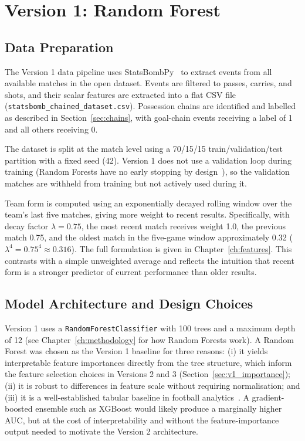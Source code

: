 \chapter{Version 1: Random Forest}\label{ch:v1}

\section{Data Preparation}

The Version 1 data pipeline uses StatsBombPy~\cite{statsbombpy} to extract events from all available matches in the open dataset. Events are filtered to passes, carries, and shots, and their scalar features are extracted into a flat CSV file (\texttt{statsbomb\_chained\_dataset.csv}). Possession chains are identified and labelled as described in Section~\ref{sec:chains}, with goal-chain events receiving a label of 1 and all others receiving 0.

The dataset is split at the match level using a 70/15/15 train/validation/test partition with a fixed seed (42). Version 1 does not use a validation loop during training (Random Forests have no early stopping by design~\cite{breiman2001}), so the validation matches are withheld from training but not actively used during it.

Team form is computed using an exponentially decayed rolling window over the team's last five matches, giving more weight to recent results. Specifically, with decay factor $\lambda = 0.75$, the most recent match receives weight 1.0, the previous match 0.75, and the oldest match in the five-game window approximately 0.32 ($\lambda^4 = 0.75^4 \approx 0.316$). The full formulation is given in Chapter~\ref{ch:features}. This contrasts with a simple unweighted average and reflects the intuition that recent form is a stronger predictor of current performance than older results.

\section{Model Architecture and Design Choices}

Version 1 uses a \texttt{RandomForestClassifier} with 100 trees and a maximum depth of 12 (see Chapter~\ref{ch:methodology} for how Random Forests work). A Random Forest was chosen as the Version 1 baseline for three reasons: (i) it yields interpretable feature importances directly from the tree structure, which inform the feature selection choices in Versions 2 and 3 (Section~\ref{sec:v1_importance}); (ii) it is robust to differences in feature scale without requiring normalisation; and (iii) it is a well-established tabular baseline in football analytics~\cite{lucey2015}. A gradient-boosted ensemble such as XGBoost would likely produce a marginally higher AUC, but at the cost of interpretability and without the feature-importance output needed to motivate the Version 2 architecture.

